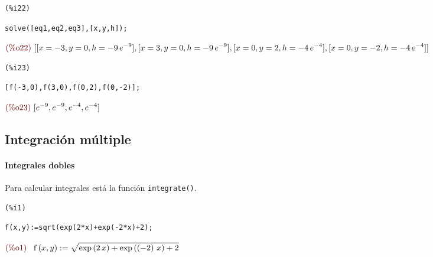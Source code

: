 \documentclass[12pt]{article}
\begin{document}
\noindent
\begin{minipage}[t]{8ex}{\color{red}\bf
\begin{verbatim}
(%i22) 
\end{verbatim}}
\end{minipage}
\begin{minipage}[t]{\textwidth}{\color{blue}
\begin{verbatim}
solve([eq1,eq2,eq3],[x,y,h]);
\end{verbatim}}
\end{minipage}
\begin{math}\displaystyle
\parbox{8ex}{\color{labelcolor}(\%o22) }
[[x=-3,y=0,h=-9\,{e}^{-9}],[x=3,y=0,h=-9\,{e}^{-9}],[x=0,y=2,h=-4\,{e}^{-4}],[x=0,y=-2,h=-4\,{e}^{-4}]]
\end{math}


\noindent
\begin{minipage}[t]{8ex}{\color{red}\bf
\begin{verbatim}
(%i23) 
\end{verbatim}}
\end{minipage}
\begin{minipage}[t]{\textwidth}{\color{blue}
\begin{verbatim}
[f(-3,0),f(3,0),f(0,2),f(0,-2)];
\end{verbatim}}
\end{minipage}
\begin{math}\displaystyle
\parbox{8ex}{\color{labelcolor}(\%o23) }
[{e}^{-9},{e}^{-9},{e}^{-4},{e}^{-4}]
\end{math}

\pagebreak

\subsection{Integración múltiple}
\paragraph{Integrales dobles} Para calcular integrales está la función \texttt{integrate()}.

\noindent
\begin{minipage}[t]{8ex}{\color{red}\bf
\begin{verbatim}
(%i1) 
\end{verbatim}}
\end{minipage}
\begin{minipage}[t]{\textwidth}{\color{blue}
\begin{verbatim}
f(x,y):=sqrt(exp(2*x)+exp(-2*x)+2);
\end{verbatim}}
\end{minipage}
\begin{math}\displaystyle
\parbox{8ex}{\color{labelcolor}(\%o1) }
\mathrm{f}\left( x,y\right) :=\sqrt{\mathrm{exp}\left( 2\,x\right) +\mathrm{exp}\left( \left( -2\right) \,x\right) +2}
\end{math}
\end{document}
